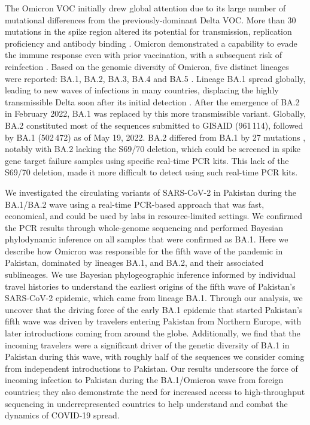 The Omicron VOC initially drew global attention due to its large number of mutational differences from the previously-dominant Delta VOC.
More than 30 mutations in the spike region altered its potential for transmission, replication proficiency and antibody binding \cite{viana2022rapid}.
Omicron demonstrated a capability to evade the immune response even with prior vaccination, with a subsequent risk of reinfection \cite{cele2022Omicron, lista2022p681h}.
Based on the genomic diversity of Omicron, five distinct lineages were reported: BA.1, BA.2, BA.3, BA.4 and BA.5 \cite{o2022pango}.
Lineage BA.1 spread globally, leading to new waves of infections in many countries, displacing the highly transmissible Delta soon after its initial detection \cite{yamasoba2022virological}.
After the emergence of BA.2 in February 2022, BA.1 was replaced by this more transmissible variant.
Globally, BA.2 constituted most of the sequences submitted to GISAID (961\,114), followed by BA.1 (502\,472) as of May 19, 2022.
BA.2 differed from BA.1 by 27 mutations \cite{wolter2022early}, notably with BA.2 lacking the S69/70 deletion, which could be screened in spike gene target failure samples using specific real-time PCR kits.
This lack of the S69/70 deletion, made it more difficult to detect using such real-time PCR kits.

We investigated the circulating variants of SARS-CoV-2 in Pakistan during the BA.1/BA.2 wave using a real-time PCR-based approach that was fast, economical, and could be used by labs in resource-limited settings.
We confirmed the PCR results through whole-genome sequencing and performed Bayesian phylodynamic inference on all samples that were confirmed as BA.1.
Here we describe how Omicron was responsible for the fifth wave of the pandemic in Pakistan, dominated by lineages BA.1, and BA.2, and their associated sublineages.
We use Bayesian phylogeographic inference informed by individual travel histories to understand the earliest origins of the fifth wave of Pakistan's SARS-CoV-2 epidemic, which came from lineage BA.1.
Through our analysis, we uncover that the driving force of the early BA.1 epidemic that started Pakistan's fifth wave was driven by travelers entering Pakistan from Northern Europe, with later introductions coming from around the globe.
Additionally, we find that the incoming travelers were a significant driver of the genetic diversity of BA.1 in Pakistan during this wave, with roughly half of the sequences we consider coming from independent introductions to Pakistan.
Our results underscore the force of incoming infection to Pakistan during the BA.1/Omicron wave from foreign countries; they also demonstrate the need for increased access to high-throughput sequencing in underrepresented countries to help understand and combat the dynamics of COVID-19 spread.


